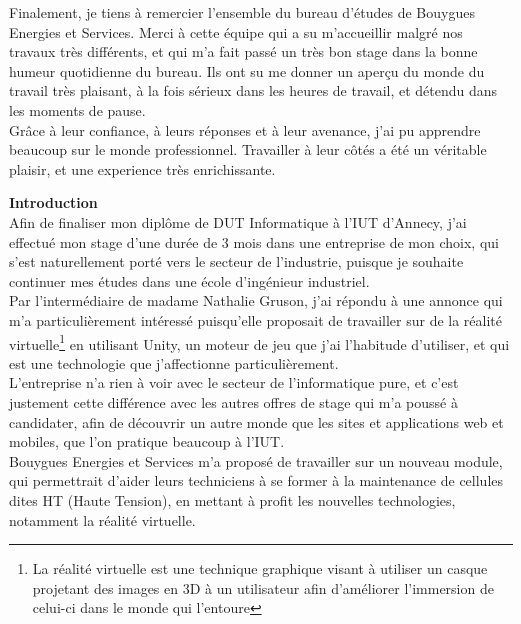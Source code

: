 \documentclass[a4paper]{article}
\begin{document}
    Finalement, je tiens à remercier l'ensemble du bureau d'études de Bouygues Energies et Services. Merci à cette équipe qui a su m'accueillir malgré nos travaux très différents, et qui m'a fait passé un très bon stage dans la bonne humeur quotidienne du bureau. Ils ont su me donner un aperçu du monde du travail très plaisant, à la fois sérieux dans les heures de travail, et détendu dans les moments de pause. \vspace{10pt} \\

    Grâce à leur confiance, à leurs réponses et à leur avenance, j'ai pu apprendre beaucoup sur le monde professionnel. Travailler à leur côtés a été un véritable plaisir, et une experience très enrichissante. \\
    
    \newpage
    \tableofcontents

    \newpage 
    \huge \textbf{Introduction} \vspace{20pt} \\
    \normalsize
    Afin de finaliser mon diplôme de DUT Informatique à l'IUT d'Annecy, j'ai effectué mon stage d'une durée de 3 mois dans une entreprise de mon choix, qui s'est naturellement porté vers le secteur de l'industrie, puisque je souhaite continuer mes études dans une école d'ingénieur industriel. \\

    Par l'intermédiaire de madame Nathalie Gruson, j'ai répondu à une annonce qui m'a particulièrement intéressé puisqu'elle proposait de travailler sur de la réalité virtuelle\footnote{La réalité virtuelle est une technique graphique visant à utiliser un casque projetant des images en 3D à un utilisateur afin d'améliorer l'immersion de celui-ci dans le monde qui l'entoure} en utilisant Unity, un moteur de jeu que j'ai l'habitude d'utiliser, et qui est une technologie que j'affectionne particulièrement. \\

    L'entreprise n'a rien à voir avec le secteur de l'informatique pure, et c'est justement cette différence avec les autres offres de stage qui m'a poussé à candidater, afin de découvrir un autre monde que les sites et applications web et mobiles, que l'on pratique beaucoup à l'IUT. \\
    
    Bouygues Energies et Services m'a proposé de travailler sur un nouveau module, qui permettrait d'aider leurs techniciens à se former à la maintenance de cellules dites HT (Haute Tension), en mettant à profit les nouvelles technologies, notamment la réalité virtuelle. \\
\end{document}
